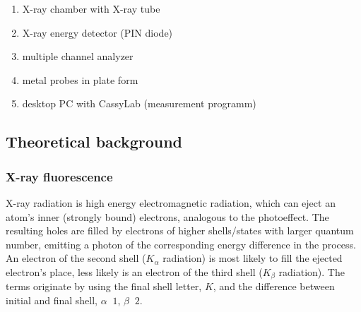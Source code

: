 \begin{enumerate}
    \item X-ray chamber with X-ray tube
    \item X-ray energy detector (PIN diode)
    \item multiple channel analyzer
    \item metal probes in plate form
    \item desktop PC with CassyLab (measurement programm)
\end{enumerate}


\subsection[Theoretical background]{Theoretical background \protect\autocite{Skript_2.2}}
\subsubsection{X-ray fluorescence}
X-ray radiation is high energy electromagnetic radiation, which can eject an atom's inner (strongly bound) electrons, analogous to the photoeffect. The resulting holes are filled by electrons of higher shells/states with larger quantum number, emitting a photon of the corresponding energy difference in the process. An electron of the second shell (\(K_\alpha\) radiation) is most likely to fill the ejected electron's place, less likely is an electron of the third shell (\(K_\beta\) radiation). The terms originate by using the final shell letter, \(K\), and the difference between initial and final shell, \(\alpha\mathop{\hat{=}}1\), \(\beta\mathop{\hat{=}}2\).

